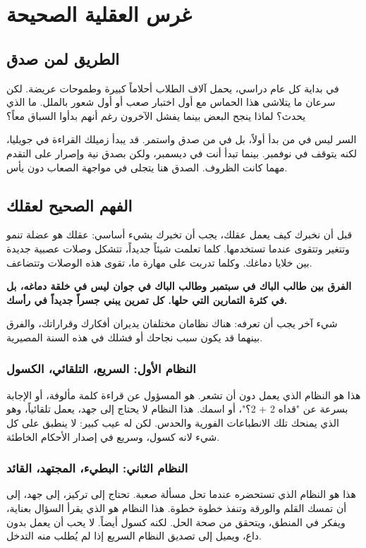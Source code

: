 \documentclass[12pt,a4paper]{book}
\newcommand{\importantAr}[1]{%
	\begin{important}
		\bfseries #1
	\end{important}
}
\begin{document}
	\chapter{غرس العقلية الصحيحة}
	\label{chap:mindset}
	
	\section {الطريق لمن صدق}
	
	في بداية كل عام دراسي، يحمل آلاف الطلاب أحلاماً كبيرة وطموحات عريضة. لكن سرعان ما يتلاشى هذا الحماس مع أول اختبار صعب أو أول شعور بالملل. ما الذي يحدث؟ لماذا ينجح البعض بينما يفشل الآخرون رغم أنهم بدأوا السباق معاً؟
	
	السر ليس في من بدأ أولاً، بل في من صدق واستمر. قد يبدأ زميلك القراءة في جويليا، لكنه يتوقف في نوفمبر. بينما تبدأ أنت في ديسمبر، ولكن بصدق نية وإصرار على التقدم مهما كانت الظروف. الصدق هنا يتجلى في مواجهة الصعاب دون يأس.
	
	\section{الفهم الصحيح لعقلك}
	\label{sec:two-systems}
	
	قبل أن نخبرك كيف يعمل عقلك، يجب أن تخبرك بشيء أساسي: عقلك هو عضلة تنمو وتتغير وتتقوى عندما تستخدمها. كلما تعلمت شيئاً جديداً، تتشكل وصلات عصبية جديدة بين خلايا دماغك. وكلما تدربت على مهارة ما، تقوى هذه الوصلات وتتضاعف.
	
	\importantAr{الفرق بين طالب الباك في سبتمبر وطالب الباك في جوان ليس في خلقة دماغه، بل في كثرة التمارين التي حلها. كل تمرين يبني جسراً جديداً في رأسك.}
	
	شيء آخر يجب أن تعرفه: هناك نظامان مختلفان يديران أفكارك وقراراتك، والفرق بينهما قد يكون سبب نجاحك أو فشلك في هذه السنة المصيرية.
	
	\subsection{النظام الأول: السريع، التلقائي، الكسول}
	\label{sub:sec:system1}
	هذا هو النظام الذي يعمل دون أن تشعر. هو المسؤول عن قراءة كلمة مألوفة، أو الإجابة بسرعة عن "قداه 2 + 2؟"، أو اسمك. هذا النظام لا يحتاج إلى جهد، يعمل تلقائياً، وهو الذي يمنحك تلك الانطباعات الفورية والحدس. لكن له عيب كبير: لا ينطبق على كل شيء لانه كسول، وسريع في إصدار الأحكام الخاطئة.
	
	\subsection{النظام الثاني: البطيء، المجتهد، القائد}
		\label{sub:sec:system2}
	هذا هو النظام الذي تستحضره عندما تحل مسألة صعبة. تحتاج إلى تركيز، إلى جهد، إلى أن تمسك القلم والورقة وتنفذ خطوة خطوة. هذا النظام هو الذي يقرأ السؤال بعناية، ويفكر في المنطق، ويتحقق من صحة الحل. لكنه كسول أيضاً. لا يحب أن يعمل بدون داع، ويميل إلى تصديق النظام السريع إذا لم يُطلب منه التدخل.
	
\end{document}
